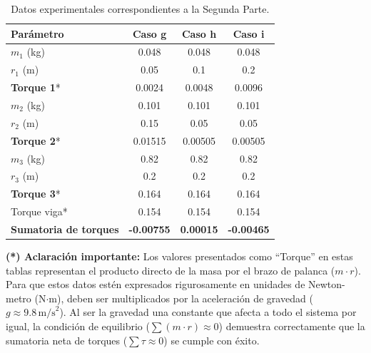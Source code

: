 \documentclass[12pt,a4paper]{article}
\begin{document}
\begin{table}[H]
\centering
\begin{tabular}{lccc}
\toprule
\textbf{Parámetro} & \textbf{Caso g} & \textbf{Caso h} & \textbf{Caso i} \\
\midrule
$m_1$ (kg) & 0.048 & 0.048 & 0.048 \\
$r_1$ (m) & 0.05 & 0.1 & 0.2 \\
\textbf{Torque 1}* & 0.0024 & 0.0048 & 0.0096 \\
\midrule
$m_2$ (kg) & 0.101 & 0.101 & 0.101 \\
$r_2$ (m) & 0.15 & 0.05 & 0.05 \\
\textbf{Torque 2}* & 0.01515 & 0.00505 & 0.00505 \\
\midrule
$m_3$ (kg) & 0.82 & 0.82 & 0.82 \\
$r_3$ (m) & 0.2 & 0.2 & 0.2 \\
\textbf{Torque 3}* & 0.164 & 0.164 & 0.164 \\
\midrule
Torque viga* & 0.154 & 0.154 & 0.154 \\
\textbf{Sumatoria de torques} & \textbf{-0.00755} & \textbf{0.00015} & \textbf{-0.00465} \\
\bottomrule
\end{tabular}
\caption{Datos experimentales correspondientes a la Segunda Parte.}
\end{table}

\vspace{0.5cm}
\textbf{(*) Aclaración importante:} Los valores presentados como ``Torque'' en estas tablas representan el producto directo de la masa por el brazo de palanca ($m \cdot r$). Para que estos datos estén expresados rigurosamente en unidades de Newton-metro (N$\cdot$m), deben ser multiplicados por la aceleración de gravedad ($g \approx 9.8 \, \text{m/s}^2$). Al ser la gravedad una constante que afecta a todo el sistema por igual, la condición de equilibrio ($\sum (m \cdot r) \approx 0$) demuestra correctamente que la sumatoria neta de torques ($\sum \tau \approx 0$) se cumple con éxito.
\end{document}
